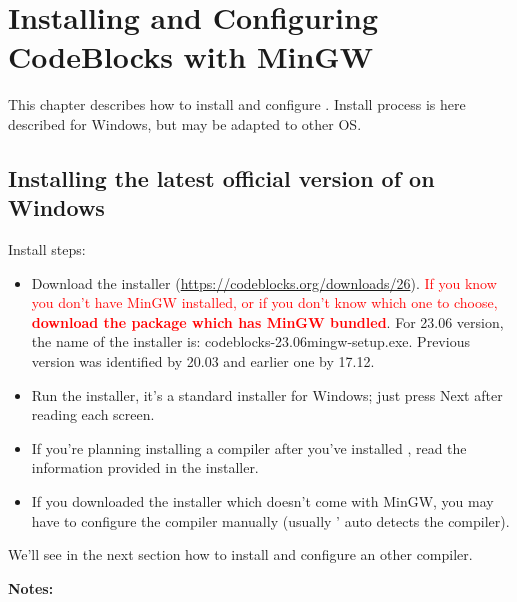 \chapter{Installing and Configuring CodeBlocks with MinGW}\label{sec:install_codeblocks}

This chapter describes how to install and configure \codeblocks. Install process is here described for Windows, but may be adapted to other OS.

\section{Installing the latest official version of \codeblocks on Windows}
Install steps:
\begin{itemize}
\item Download the \codeblocks installer (\url{https://codeblocks.org/downloads/26}). \textcolor{red}{If you know you don't have MinGW installed, or if you don't know which one to choose, \textbf{download the package which has MinGW bundled}}. For 23.06 version, the name of the installer is: codeblocks-23.06mingw-setup.exe. Previous version was identified by 20.03 and earlier one by 17.12.
\item Run the installer, it's a standard installer for Windows; just press Next after reading each screen.
\item If you're planning installing a compiler after you've installed \codeblocks, read the information provided in the installer.
\item If you downloaded the installer which doesn't come with MinGW, you may have to configure the compiler manually (usually \codeblocks' auto detects the compiler).
\end{itemize}

We'll see in the next section how to install and configure an other compiler.

\textbf{Notes:}

